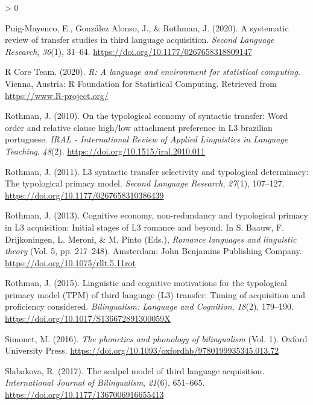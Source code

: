 \documentclass[
  english,
  man]{apa6}
\newlength{\cslhangindent}
\newenvironment{CSLReferences}[2] %
 {%
  \setlength{\parindent}{0pt}
  \ifodd #1 \everypar{\setlength{\hangindent}{\cslhangindent}}\ignorespaces\fi
  \ifnum #2 > 0
  \setlength{\parskip}{#2\baselineskip}
  \fi
 }%
 {}
\begin{document}
\begin{CSLReferences}{1}{0}
\leavevmode\hypertarget{ref-puig-mayenco_systematic_2020}{}%
Puig-Mayenco, E., González Alonso, J., \& Rothman, J. (2020). A systematic review of transfer studies in third language acquisition. \emph{Second Language Research}, \emph{36}(1), 31--64. \url{https://doi.org/10.1177/0267658318809147}

\leavevmode\hypertarget{ref-R-base}{}%
R Core Team. (2020). \emph{R: A language and environment for statistical computing}. Vienna, Austria: R Foundation for Statistical Computing. Retrieved from \url{https://www.R-project.org/}

\leavevmode\hypertarget{ref-rothman_typological_2010}{}%
Rothman, J. (2010). On the typological economy of syntactic transfer: Word order and relative clause high/low attachment preference in L3 brazilian portuguese. \emph{{IRAL} - International Review of Applied Linguistics in Language Teaching}, \emph{48}(2). \url{https://doi.org/10.1515/iral.2010.011}

\leavevmode\hypertarget{ref-rothman_l3_2011}{}%
Rothman, J. (2011). L3 syntactic transfer selectivity and typological determinacy: The typological primacy model. \emph{Second Language Research}, \emph{27}(1), 107--127. \url{https://doi.org/10.1177/0267658310386439}

\leavevmode\hypertarget{ref-baauw_cognitive_2013}{}%
Rothman, J. (2013). Cognitive economy, non-redundancy and typological primacy in L3 acquisition: Initial stages of L3 romance and beyond. In S. Baauw, F. Drijkoningen, L. Meroni, \& M. Pinto (Eds.), \emph{Romance languages and linguistic theory} (Vol. 5, pp. 217--248). Amsterdam: John Benjamins Publishing Company. \url{https://doi.org/10.1075/rllt.5.11rot}

\leavevmode\hypertarget{ref-rothman_linguistic_2015}{}%
Rothman, J. (2015). Linguistic and cognitive motivations for the typological primacy model ({TPM}) of third language (L3) transfer: Timing of acquisition and proficiency considered. \emph{Bilingualism: Language and Cognition}, \emph{18}(2), 179--190. \url{https://doi.org/10.1017/S136672891300059X}

\leavevmode\hypertarget{ref-simonet_phonetics_2016}{}%
Simonet, M. (2016). \emph{The phonetics and phonology of bilingualism} (Vol. 1). Oxford University Press. \url{https://doi.org/10.1093/oxfordhb/9780199935345.013.72}

\leavevmode\hypertarget{ref-slabakova_scalpel_2017}{}%
Slabakova, R. (2017). The scalpel model of third language acquisition. \emph{International Journal of Bilingualism}, \emph{21}(6), 651--665. \url{https://doi.org/10.1177/1367006916655413}


\end{CSLReferences}
\end{document}
